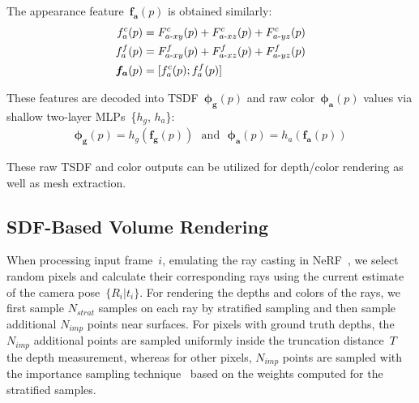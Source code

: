 The appearance feature~$\boldsymbol{f_{a}}(p)$ is obtained similarly:
\begin{align}
	f^{c}_{a}(p) &= F^{c}_{a\text{-}xy}(p) + F^{c}_{a\text{-}xz}(p) + F^{c}_{a\text{-}yz}(p) \notag \\
	f^{f}_{a}(p) &= F^{f}_{a\text{-}xy}(p) + F^{f}_{a\text{-}xz}(p) + F^{f}_{a\text{-}yz}(p) \notag \\
	\boldsymbol{f_{a}}(p) &= [f^{c}_{a}(p) ; f^{f}_{a}(p)]
\end{align}

These features are decoded into TSDF~$\boldsymbol{\phi_{g}}(p)$ and raw color~$\boldsymbol{\phi_{a}}(p)$ values via shallow two-layer MLPs~\{$h_{g}$, $h_{a}$\}:
\begin{align}
	\boldsymbol{\phi_{g}}(p) = h_{g}\left(\boldsymbol{f_{g}}(p)\right) \text{~~and~~} \boldsymbol{\phi_{a}}(p) = h_{a}\left(\boldsymbol{f_{a}}(p)\right)
\end{align}

These raw TSDF and color outputs can be utilized for depth/color rendering as well as mesh extraction.

\subsection{SDF-Based Volume Rendering} \label{sec:c4_rendering}

When processing input frame~$i$, emulating the ray casting in NeRF~\citep{mildenhall2020nerf}, we select random pixels and calculate their corresponding rays using the current estimate of the camera pose~$\{R_{i}| t_{i}\}$. For rendering the depths and colors of the rays, we first sample $N_{strat}$ samples on each ray by stratified sampling and then sample additional $N_{imp}$ points near surfaces. For pixels with ground truth depths, the $N_{imp}$ additional points are sampled uniformly inside the truncation distance~$T$ \wrt the depth measurement, whereas for other pixels, $N_{imp}$ points are sampled with the importance sampling technique~\citep{mildenhall2020nerf, martin2021nerf, wang2022go, sucar2021imap} based on the weights computed for the stratified samples.

